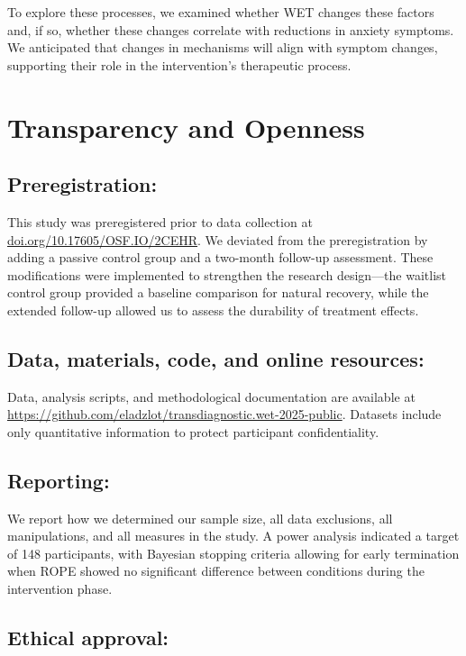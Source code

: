 \documentclass[
  man,floatsintext]{apa7}
\begin{document}
To explore these processes, we examined whether WET changes these factors and, if so, whether these changes correlate with reductions in anxiety symptoms.
We anticipated that changes in mechanisms will align with symptom changes, supporting their role in the intervention's therapeutic process.

\section{Transparency and Openness}\label{transparency-and-openness}

\subsection{Preregistration:}\label{preregistration}

This study was preregistered prior to data collection at \url{doi.org/10.17605/OSF.IO/2CEHR}.
We deviated from the preregistration by adding a passive control group and a two-month follow-up assessment.
These modifications were implemented to strengthen the research design---the waitlist control group provided a baseline comparison for natural recovery, while the extended follow-up allowed us to assess the durability of treatment effects.

\subsection{Data, materials, code, and online resources:}\label{data-materials-code-and-online-resources}

Data, analysis scripts, and methodological documentation are available at \url{https://github.com/eladzlot/transdiagnostic.wet-2025-public}.
Datasets include only quantitative information to protect participant confidentiality.

\subsection{Reporting:}\label{reporting}

We report how we determined our sample size, all data exclusions, all manipulations, and all measures in the study.
A power analysis indicated a target of 148 participants, with Bayesian stopping criteria allowing for early termination when ROPE showed no significant difference between conditions during the intervention phase.

\subsection{Ethical approval:}\label{ethical-approval}
\end{document}
